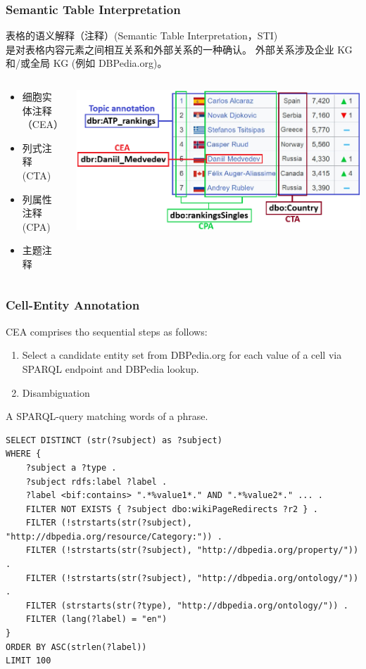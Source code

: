 \documentclass[10pt]{beamer}
\begin{document}
\begin{frame}
  \frametitle{Semantic Table Interpretation}

  表格的语义解释（注释）(Semantic Table Interpretation，STI)\\
  是对表格内容元素之间相互关系和外部关系的一种确认。 外部关系涉及企业 KG\\
  和/或全局 KG (例如 DBPedia.org)。

  \begin{columns}
    \begin{column}{0.4\textwidth}
      \begin{itemize}
      \item 细胞实体注释（CEA）
      \item 列式注释 (CTA)
      \item 列属性注释 (CPA)
      \item 主题注释
      \end{itemize}
    \end{column}
    \begin{column}{0.7\textwidth}
    \includegraphics[width=\linewidth]{table-sem-interp.png}
  \end{column}
\end{columns}
\end{frame}

\begin{frame}[fragile]
  \frametitle{Cell-Entity Annotation}
  CEA comprises tho sequential steps as follows:
  \begin{enumerate}
  \item Select a candidate entity set from DBPedia.org for each value of a cell via SPARQL endpoint and DBPedia lookup.
  \item Disambiguation
  \end{enumerate}


A SPARQL-query matching words of a phrase.
\begin{verbatim}
SELECT DISTINCT (str(?subject) as ?subject)
WHERE {
    ?subject a ?type .
    ?subject rdfs:label ?label .
    ?label <bif:contains> ".*%value1*." AND ".*%value2*." ... .
    FILTER NOT EXISTS { ?subject dbo:wikiPageRedirects ?r2 } .
    FILTER (!strstarts(str(?subject), "http://dbpedia.org/resource/Category:")) .
    FILTER (!strstarts(str(?subject), "http://dbpedia.org/property/")) .
    FILTER (!strstarts(str(?subject), "http://dbpedia.org/ontology/")) .
    FILTER (strstarts(str(?type), "http://dbpedia.org/ontology/")) .
    FILTER (lang(?label) = "en")
}
ORDER BY ASC(strlen(?label))
LIMIT 100
\end{verbatim}
\end{frame}
\end{document}
